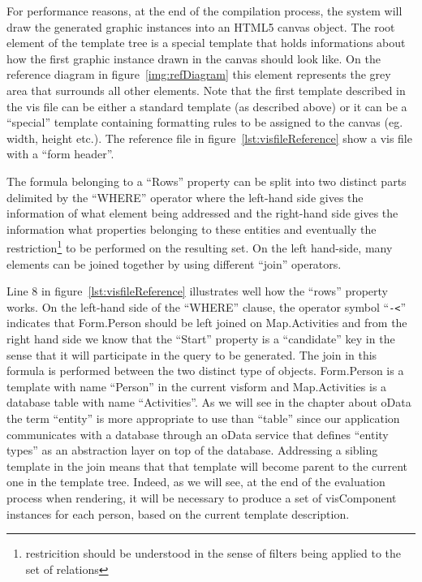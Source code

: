 For performance reasons, at the end of the compilation process, the system will draw the generated graphic instances into an HTML5 canvas object. The root element of the template tree is a special template that holds informations about how the first graphic instance drawn in the canvas should look like. On the reference diagram in figure~\ref{img:refDiagram} this element represents the grey area that surrounds all other elements. Note that the first template described in the vis file can be either a standard template (as described above) or it can be a ``special'' template containing formatting rules to be assigned to the canvas (eg. width, height etc.). The reference file in figure~\ref{lst:visfileReference} show a vis file with a ``form header''.

The formula belonging to a ``Rows'' property can be split into two distinct parts delimited by the ``WHERE'' operator where the left-hand side gives the information of what element being addressed and the right-hand side gives the information what properties belonging to these entities and eventually the restriction\footnote{restricition should be understood in the sense of filters being applied to the set of relations} to be performed on the resulting set. On the left hand-side, many elements can be joined together by using different ``join'' operators.

Line 8 in figure~\ref{lst:visfileReference} illustrates well how the ``rows'' property works. On the left-hand side of the ``WHERE'' clause, the operator symbol ``\texttt{-<}'' indicates that Form.Person should be left joined on Map.Activities and from the right hand side we know that the ``Start'' property is a ``candidate'' key in the sense that it will participate in the query to be generated. The join in this formula is performed between the two distinct type of objects. Form.Person is a template with name ``Person'' in the current visform and Map.Activities is a database table with name ``Activities''. As we will see in the chapter about oData the term ``entity'' is more appropriate to use than ``table'' since our application communicates with a database through an oData service that defines ``entity types'' as an abstraction layer on top of the database. Addressing a sibling template in the join means that that template will become parent to the current one in the template tree. Indeed, as we will see, at the end of the evaluation process when rendering, it will be necessary to produce a set of visComponent instances for each person, based on the current template description.

